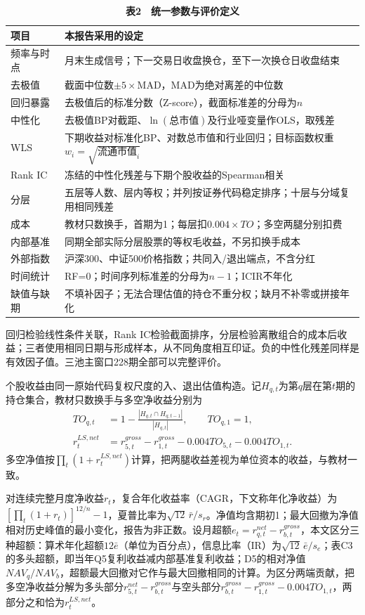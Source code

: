 \begin{table}[htbp]\centering
\caption*{\textbf{表2　统一参数与评价定义}}
\small\renewcommand{\arraystretch}{1.18}
\begin{tabularx}{\linewidth}{@{}p{25mm}X@{}}\toprule
项目 & 本报告采用的设定 \\ \midrule
频率与时点 & 月末生成信号；下一交易日收盘换仓，至下一次换仓日收盘结束 \\
去极值 & 截面中位数$\pm5\times\mathrm{MAD}$，MAD为绝对离差的中位数 \\
回归暴露 & 去极值后的标准分数（Z-score），截面标准差的分母为$n$ \\
中性化 & 去极值BP对截距、$\ln(\text{总市值})$及行业哑变量作OLS，取残差 \\
WLS & 下期收益对标准化BP、对数总市值和行业回归；目标函数权重$w_i=\sqrt{\text{流通市值}_i}$ \\
Rank IC & 冻结的中性化残差与下期个股收益的Spearman相关 \\
分层 & 五层等人数、层内等权；并列按证券代码稳定排序；十层与分域复用相同残差 \\
成本 & 教材只数换手，首期为1；每层扣$0.004\times TO$；多空两腿分别扣费 \\
内部基准 & 同期全部实际分层股票的等权毛收益，不另扣换手成本 \\
外部指数 & 沪深300、中证500价格指数；共同入/退出端点，不含分红 \\
时间统计 & RF=0；时间序列标准差的分母为$n-1$；ICIR不年化 \\
缺值与缺期 & 不填补因子；无法合理估值的持仓不重分权；缺月不补零或拼接年化 \\
\bottomrule\end{tabularx}
\end{table}

回归检验线性条件关联，Rank IC检验截面排序，分层检验离散组合的成本后收益；三者使用相同日期与形成样本，从不同角度相互印证。负的中性化残差同样是有效因子值。三池主窗口228期全部可以完整评价。

个股收益由同一原始代码复权尺度的入、退出估值构造。记$H_{q,t}$为第$q$层在第$t$期的持仓集合，教材只数换手与多空净收益分别为
\begin{align}
TO_{q,t}&=1-\frac{|H_{q,t}\cap H_{q,t-1}|}{|H_{q,t}|},\qquad TO_{q,1}=1,\\
r^{LS,net}_t&=r^{gross}_{5,t}-r^{gross}_{1,t}-0.004TO_{5,t}-0.004TO_{1,t}.
\end{align}
多空净值按$\prod_t(1+r^{LS,net}_t)$计算，把两腿收益差视为单位资本的收益，与教材一致。

对连续完整月度净收益$r_t$，复合年化收益率（CAGR，下文称年化净收益）为$[\prod_t(1+r_t)]^{12/n}-1$，夏普比率为$\sqrt{12}\,\bar r/s_r$。净值均含期初1；最大回撤为净值相对历史峰值的最小变化，报告为非正数。设月超额$e_t=r_{q,t}^{net}-r_{b,t}^{gross}$，本文区分三种超额：算术年化超额$12\bar e$（单位为百分点），信息比率（IR）为$\sqrt{12}\,\bar e/s_e$；表C3的多头超额，即当年Q5复利收益减内部基准复利收益；D5的相对净值$NAV_q/NAV_b$，超额最大回撤对它作与最大回撤相同的计算。为区分两端贡献，把多空净收益分解为多头部分$r^{net}_{5,t}-r^{gross}_{b,t}$与空头部分$r^{gross}_{b,t}-r^{gross}_{1,t}-0.004TO_{1,t}$，两部分之和恰为$r^{LS,net}_t$。

